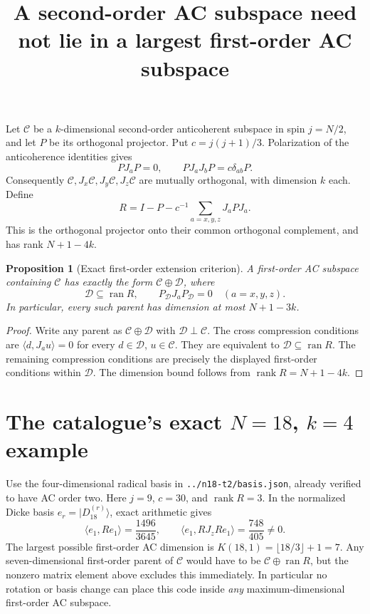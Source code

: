 \documentclass[11pt]{article}
\newtheorem{proposition}{Proposition}
\begin{document}
\title{A second-order AC subspace need not lie in a largest first-order AC subspace}
\author{}\date{}\maketitle

Let $\mathcal C$ be a $k$-dimensional second-order anticoherent subspace in
spin $j=N/2$, and let $P$ be its orthogonal projector. Put
$c=j(j+1)/3$. Polarization of the anticoherence identities gives
\[
 PJ_aP=0,\qquad PJ_aJ_bP=c\delta_{ab}P.
\]
Consequently $\mathcal C,J_x\mathcal C,J_y\mathcal C,J_z\mathcal C$ are
mutually orthogonal, with dimension $k$ each. Define
\[
 R=I-P-c^{-1}\sum_{a=x,y,z}J_aPJ_a.
\]
This is the orthogonal projector onto their common orthogonal complement,
and has rank $N+1-4k$.

\begin{proposition}[Exact first-order extension criterion]
A first-order AC subspace containing $\mathcal C$ has exactly the form
$\mathcal C\oplus\mathcal D$, where
\[
 \mathcal D\subseteq\operatorname{ran}R,
 \qquad P_{\mathcal D}J_aP_{\mathcal D}=0\quad(a=x,y,z).
\]
In particular, every such parent has dimension at most $N+1-3k$.
\end{proposition}
\begin{proof}
Write any parent as $\mathcal C\oplus\mathcal D$ with
$\mathcal D\perp\mathcal C$. The cross compression conditions are
$\langle d,J_a u\rangle=0$ for every $d\in\mathcal D$, $u\in\mathcal C$.
They are equivalent to $\mathcal D\subseteq\operatorname{ran}R$.
The remaining compression conditions are precisely the displayed
first-order conditions within $\mathcal D$. The dimension bound follows
from $\operatorname{rank}R=N+1-4k$.
\end{proof}

\section*{The catalogue's exact $N=18$, $k=4$ example}
Use the four-dimensional radical basis in
\texttt{../n18-t2/basis.json}, already verified to have AC order two.
Here $j=9$, $c=30$, and $\operatorname{rank}R=3$. In the normalized Dicke
basis $e_r=|D_{18}^{(r)}\rangle$, exact arithmetic gives
\[
 \langle e_1,Re_1\rangle=\frac{1496}{3645},\qquad
 \langle e_1,RJ_zRe_1\rangle=\frac{748}{405}\ne0.
\]
The largest possible first-order AC dimension is
$K(18,1)=\lfloor18/3\rfloor+1=7$.
Any seven-dimensional first-order parent of $\mathcal C$ would have to be
$\mathcal C\oplus\operatorname{ran}R$, but the nonzero matrix element
above excludes this immediately. In particular no rotation or basis
change can place this code inside \emph{any} maximum-dimensional
first-order AC subspace.
\end{document}
